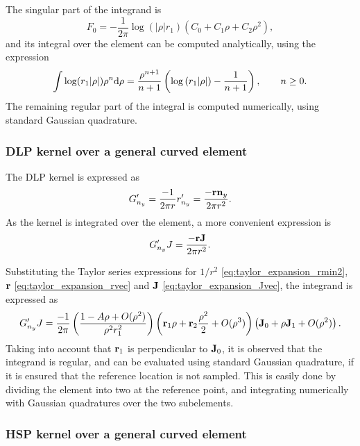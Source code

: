 The singular part of the integrand is
%
\begin{equation}
	F_0 = -\frac{1}{2\pi} \log \left(|\rho| r_1\right) \left( C_0 + C_1 \rho + C_2 \rho^2 \right)
	,
\end{equation}
%
and its integral over the element can be computed analytically, using the expression
%
\begin{equation}
	\int \log(r_1 |\rho|) \rho^n \mathrm{d} \rho = \frac{\rho^{n+1}}{n+1} \left( \log\left(r_1 |\rho|\right) - \frac{1}{n+1} \right)
	, \qquad n \ge 0
	.
\end{equation}
%
The remaining regular part of the integral is computed numerically, using standard Gaussian quadrature.


\subsubsection{DLP kernel over a general curved element}

The DLP kernel is expressed as
%
\begin{equation}
	G'_{n_y} = \frac{-1}{2\pi r} r'_{n_y}
	= \frac{-{\bf r} {\bf n}_y}{2\pi r^2} 
	.
\end{equation}
%
As the kernel is integrated over the element, a more convenient expression is
%
\begin{equation}
	G'_{n_y} J = \frac{-{\bf r} {\bf J}}{2\pi r^2} 
	.
\end{equation}

Substituting the Taylor series expressions for $1/r^2$ \eqref{eq:taylor_expansion_rmin2}, ${\bf r}$ \eqref{eq:taylor_expansion_rvec} and ${\bf J}$ \eqref{eq:taylor_expansion_Jvec}, the integrand is expressed as
%
\begin{equation}
	G'_{n_y} J = \frac{-1}{2\pi} \left(\frac{1-A\rho + O(\rho^2)}{\rho^2 r_1^2}\right) 
	\left( {\bf r}_1 \rho + {\bf r}_2 \frac{\rho^2}{2} + O(\rho^3) \right) 
	\left( {\bf J}_0 + \rho {\bf J}_1 + O(\rho^2) \right)
	.
\end{equation}
%
Taking into account that ${\bf r}_1$ is perpendicular to ${\bf J}_0$, it is observed that the integrand is regular, and can be evaluated using standard Gaussian quadrature, if it is ensured that the reference location is not sampled.
This is easily done by dividing the element into two at the reference point, and integrating numerically with Gaussian quadratures over the two subelements.


\subsubsection{HSP kernel over a general curved element}

